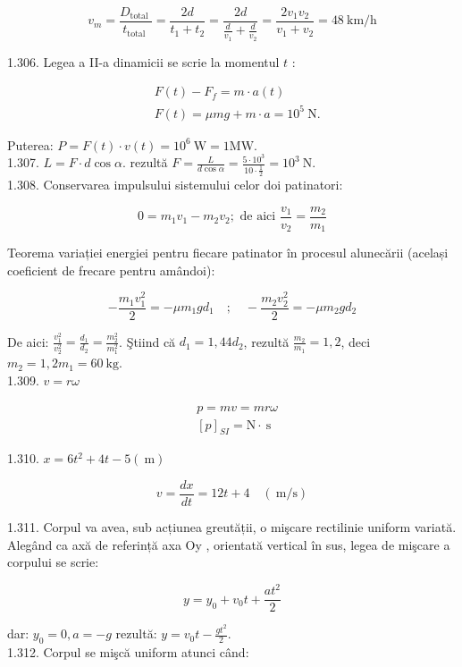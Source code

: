 $$
v_{m}=\frac{D_{\text {total }}}{t_{\text {total }}}=\frac{2 d}{t_{1}+t_{2}}=\frac{2 d}{\frac{d}{v_{1}}+\frac{d}{v_{2}}}=\frac{2 v_{1} v_{2}}{v_{1}+v_{2}}=48 \mathrm{~km} / \mathrm{h}
$$

1.306. Legea a II-a dinamicii se scrie la momentul $t$ :

$$
\begin{aligned}
& F(t)-F_{f}=m \cdot a(t) \\
& F(t)=\mu m g+m \cdot a=10^{5} \mathrm{~N} .
\end{aligned}
$$

Puterea: $P=F(t) \cdot v(t)=10^{6} \mathrm{~W}=1 \mathrm{MW}$.\\
1.307. $L=F \cdot d \cos \alpha$. rezultă $F=\frac{L}{d \cos \alpha}=\frac{5 \cdot 10^{3}}{10 \cdot \frac{1}{2}}=10^{3} \mathrm{~N}$.\\
1.308. Conservarea impulsului sistemului celor doi patinatori:

$$
0=m_{1} v_{1}-m_{2} v_{2} ; \text { de aici } \frac{v_{1}}{v_{2}}=\frac{m_{2}}{m_{1}}
$$

Teorema variației energiei pentru fiecare patinator în procesul alunecării (același coeficient de frecare pentru amândoi):

$$
-\frac{m_{1} v_{1}^{2}}{2}=-\mu m_{1} g d_{1} \quad ; \quad-\frac{m_{2} v_{2}^{2}}{2}=-\mu m_{2} g d_{2}
$$

De aici: $\frac{v_{1}^{2}}{v_{2}^{2}}=\frac{d_{1}}{d_{2}}=\frac{m_{2}^{2}}{m_{1}^{2}}$. Ştiind că $d_{1}=1,44 d_{2}$, rezultă $\frac{m_{2}}{m_{1}}=1,2$, deci $m_{2}=1,2 m_{1}=60 \mathrm{~kg}$.\\
1.309. $v=r \omega$

$$
\begin{aligned}
& p=m v=m r \omega \\
& {[p]_{S I}=\mathrm{N} \cdot \mathrm{~s}}
\end{aligned}
$$

1.310. $x=6 t^{2}+4 t-5(\mathrm{~m})$

$$
v=\frac{d x}{d t}=12 t+4 \quad(\mathrm{~m} / \mathrm{s})
$$

1.311. Corpul va avea, sub acțiunea greutății, o mişcare rectilinie uniform variată. Alegând ca axă de referință axa Oy , orientată vertical în sus, legea de mişcare a corpului se scrie:

$$
y=y_{0}+v_{0} t+\frac{a t^{2}}{2}
$$

dar: $y_{0}=0, a=-g$ rezultă: $y=v_{0} t-\frac{g t^{2}}{2}$.\\
1.312. Corpul se mişcă uniform atunci când:

